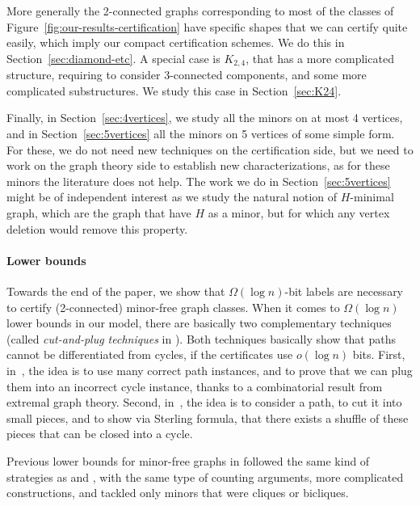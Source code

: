 \documentclass[a4paper,thm-restate,USenglish]{lipics-v2019}
\begin{document}
More generally the 2-connected graphs corresponding to most of the classes of Figure~\ref{fig:our-results-certification} have specific shapes that we can certify quite easily, which imply our compact certification schemes. 
We do this in Section~\ref{sec:diamond-etc}.
A special case is $K_{2,4}$, that has a more complicated structure, requiring to consider 3-connected components, and some more complicated substructures. We study this case in Section~\ref{sec:K24}.

Finally, in Section~\ref{sec:4vertices}, we study all the minors on at most 4 vertices, and in Section~\ref{sec:5vertices} all the minors on 5 vertices of some simple form. 
For these, we do not need new techniques on the certification side, but we need to work on the graph theory side to establish new characterizations, as for these minors the literature does not help. 
The work we do in Section~\ref{sec:5vertices} might be of independent interest as we study the natural notion of $H$-minimal graph, which are the graph that have $H$ as a minor, but for which any vertex deletion would remove this property. 

\paragraph*{Lower bounds}

Towards the end of the paper, we show that $\Omega(\log n)$-bit labels are necessary to certify (2-connected) minor-free graph classes. 
When it comes to $\Omega(\log n)$ lower bounds in our model, there are basically two complementary techniques (called \emph{cut-and-plug techniques} in \cite{Feuilloley19}). 
Both techniques basically show that paths cannot be differentiated from cycles, if the certificates use $o(\log n)$ bits.
First, in~\cite{GoosS16}, the idea is to use many correct path instances, and to prove that we can plug them into an incorrect cycle instance, thanks to a combinatorial result from extremal graph theory. 
Second, in~\cite{FeuilloleyH18}, the idea is to consider a path, to cut it into small pieces, and to show via Sterling formula, that there exists a shuffle of these pieces that can be closed into a cycle.

Previous lower bounds for minor-free graphs in \cite{FeuilloleyFMRRT20} followed the same kind of strategies as \cite{GoosS16} and \cite{FeuilloleyH18}, with the same type of counting arguments, more complicated constructions, and tackled only minors that were cliques or bicliques. 
\end{document}
